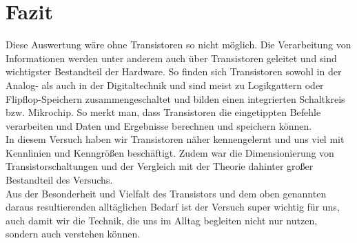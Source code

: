

\chapter{Fazit}
\label{chap:fazit}
Diese Auswertung w\"are ohne Transistoren so nicht m\"oglich. Die Verarbeitung von Informationen werden unter anderem auch \"uber Transistoren geleitet und sind wichtigster Bestandteil der Hardware. So finden sich Transistoren sowohl in der Analog- als auch in der Digitaltechnik und sind meist zu Logikgattern oder Flipflop-Speichern zusammengeschaltet und bilden einen integrierten Schaltkreis bzw.  Mikrochip. So merkt man, dass Transistoren die eingetippten Befehle verarbeiten und Daten und Ergebnisse berechnen und speichern k\"onnen. \\
In diesem Versuch haben wir Transistoren n\"aher kennengelernt und uns viel mit Kennlinien und Kenngr\"o\ss{}en besch\"aftigt. Zudem war die Dimensionierung von Transistorschaltungen und der Vergleich mit der Theorie dahinter gro\ss{}er Bestandteil des Versuchs. \\
Aus der Besonderheit und Vielfalt des Transistors und dem oben genannten daraus resultierenden allt\"aglichen Bedarf ist der Versuch super wichtig f\"ur uns, auch damit wir die Technik, die uns im Alltag begleiten nicht nur nutzen, sondern auch verstehen k\"onnen. 